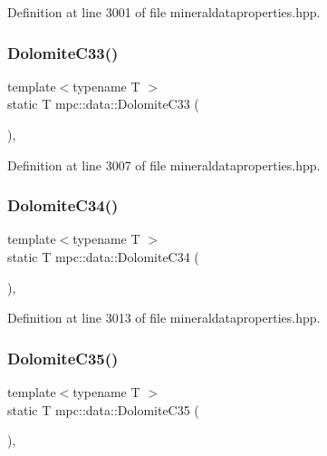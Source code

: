 Definition at line 3001 of file mineraldataproperties.\+hpp.

\mbox{\label{namespacempc_1_1data_ab41abc60d3226a2b44ed34095c63cfde}} 
\subsubsection{\texorpdfstring{Dolomite\+C33()}{DolomiteC33()}}
{\footnotesize\ttfamily template$<$typename T $>$ \\
static T mpc\+::data\+::\+Dolomite\+C33 (\begin{DoxyParamCaption}{ }\end{DoxyParamCaption})\hspace{0.3cm}{\ttfamily [inline]}, {\ttfamily [static]}}



Definition at line 3007 of file mineraldataproperties.\+hpp.

\mbox{\label{namespacempc_1_1data_a0cad13301a96a06a061d5203895efeeb}} 
\subsubsection{\texorpdfstring{Dolomite\+C34()}{DolomiteC34()}}
{\footnotesize\ttfamily template$<$typename T $>$ \\
static T mpc\+::data\+::\+Dolomite\+C34 (\begin{DoxyParamCaption}{ }\end{DoxyParamCaption})\hspace{0.3cm}{\ttfamily [inline]}, {\ttfamily [static]}}



Definition at line 3013 of file mineraldataproperties.\+hpp.

\mbox{\label{namespacempc_1_1data_a2b91c5e718a91e077f5ebdf15fbfbe23}} 
\subsubsection{\texorpdfstring{Dolomite\+C35()}{DolomiteC35()}}
{\footnotesize\ttfamily template$<$typename T $>$ \\
static T mpc\+::data\+::\+Dolomite\+C35 (\begin{DoxyParamCaption}{ }\end{DoxyParamCaption})\hspace{0.3cm}{\ttfamily [inline]}, {\ttfamily [static]}}



